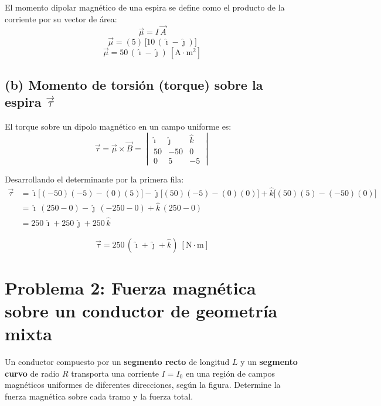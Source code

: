 \documentclass[12pt,letterpaper]{article}
\begin{document}
El momento dipolar magn\'etico de una espira se define como el producto de la corriente
por su vector de \'area:
\[
    \vec{\mu} = I\,\vec{A}
\]
\[
    \vec{\mu} = (5)\,\bigl[10\,(\hat{\imath} - \hat{\jmath})\bigr]
\]
\[
    \boxed{\vec{\mu} = 50\,(\hat{\imath} - \hat{\jmath})\ [\text{A}\cdot\text{m}^2]}
\]

\bigskip

\subsection*{(b) Momento de torsi\'on (torque) sobre la espira $\vec{\tau}$}

El torque sobre un dipolo magn\'etico en un campo uniforme es:
\[
    \vec{\tau} = \vec{\mu} \times \vec{B}
    = \begin{vmatrix}
        \hat{\imath} & \hat{\jmath} & \hat{k} \\[2pt]
        50 & -50 & 0 \\[2pt]
        0 & 5 & -5
      \end{vmatrix}
\]

Desarrollando el determinante por la primera fila:
\begin{align*}
    \vec{\tau} &= \hat{\imath}\bigl[(-50)(-5) - (0)(5)\bigr]
                - \hat{\jmath}\bigl[(50)(-5) - (0)(0)\bigr]
                + \hat{k}\bigl[(50)(5) - (-50)(0)\bigr] \\[4pt]
               &= \hat{\imath}\,(250 - 0) - \hat{\jmath}\,(-250 - 0) + \hat{k}\,(250 - 0) \\[4pt]
               &= 250\,\hat{\imath} + 250\,\hat{\jmath} + 250\,\hat{k}
\end{align*}

\[
    \boxed{\vec{\tau} = 250\,(\hat{\imath} + \hat{\jmath} + \hat{k})\ [\text{N}\cdot\text{m}]}
\]

\newpage

\section*{Problema 2: Fuerza magn\'etica sobre un conductor de geometr\'ia mixta}

\noindent Un conductor compuesto por un \textbf{segmento recto} de longitud $L$ y un
\textbf{segmento curvo} de radio $R$ transporta una corriente $I = I_0$ en una regi\'on de
campos magn\'eticos uniformes de diferentes direcciones, seg\'un la figura. Determine la
fuerza magn\'etica sobre cada tramo y la fuerza total.
\end{document}
